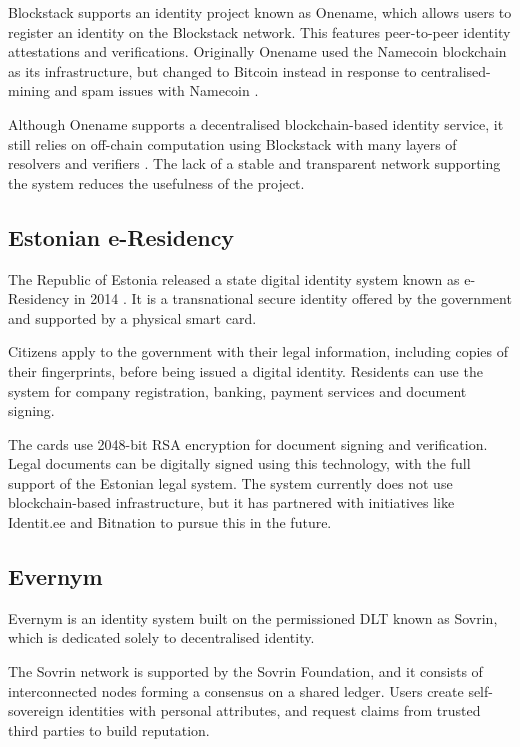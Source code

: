 Blockstack supports an identity project known as Onename, which allows users to register an identity on the Blockstack network. This features peer-to-peer identity attestations and verifications. Originally Onename used the Namecoin blockchain as its infrastructure, but changed to Bitcoin instead in response to centralised-mining and spam issues with Namecoin \cite{kyle_torpey_3_2015}. 

Although Onename supports a decentralised blockchain-based identity service, it still relies on off-chain computation using Blockstack with many layers of resolvers and verifiers \cite{onename_introducing_2015}. The lack of a stable and transparent network supporting the system reduces the usefulness of the project.

\subsection{Estonian e-Residency}
The Republic of Estonia released a state digital identity system known as e-Residency in 2014 \cite{the_digital_society_estonian_2014}. It is a transnational secure identity offered by the government and supported by a physical smart card.

Citizens apply to the government with their legal information, including copies of their fingerprints, before being issued a digital identity. Residents can use the system for company registration, banking, payment services and document signing. 

The cards use 2048-bit RSA encryption for document signing and verification. Legal documents can be digitally signed using this technology, with the full support of the Estonian legal system. The system currently does not use blockchain-based infrastructure, but it has partnered with initiatives like Identit.ee \cite{noauthor_identit.ee_nodate} and Bitnation \cite{bitnation_estonia_2015} to pursue this in the future.

\subsection{Evernym}
Evernym \cite{smith_identity_2016} is an identity system built on the permissioned \ac{DLT} known as Sovrin, which is dedicated solely to decentralised identity.

The Sovrin network is supported by the Sovrin Foundation, and it consists of interconnected nodes forming a consensus on a shared ledger. Users create self-sovereign identities with personal attributes, and request claims from trusted third parties to build reputation.

